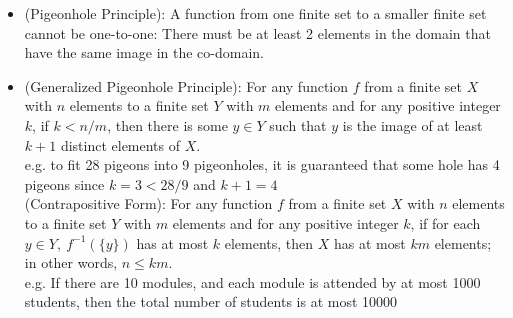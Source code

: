 \documentclass{article}
\begin{document}
\begin{itemize}
        \\ \hspace*{3mm} (2) $|A\cup B\cup C|=|A|+|B|+|C|-|A\cap B|-|A\cap C|-|B\cap C|+|A\cap B\cap C|$
    \item (Pigeonhole Principle): A function from one finite set to a smaller finite set cannot be one-to-one: There must be at least 2 elements in the domain that have the same image in the co-domain.
    \item (Generalized Pigeonhole Principle): For any function $f$ from a finite set $X$ with $n$ elements to a finite set $Y$ with $m$ elements and for any positive integer $k$, if $k<n/m$, then there is some $y\in Y$ such that $y$ is the image of at least $k+1$ distinct elements of $X$.
        \smallskip
        \\ \hspace*{3mm} e.g. to fit 28 pigeons into 9 pigeonholes, it is guaranteed that some hole has 4 pigeons since $k=3<28/9$ and \hspace*{10mm} $k+1=4$
        \smallskip
        \\(Contrapositive Form): For any function $f$ from a finite set $X$ with $n$ elements to a finite set $Y$ with $m$ elements and for any positive integer $k$, if for each $y\in Y,\  f^{-1}(\{y\})$ has at most $k$ elements, then $X$ has at most $km$ elements; in other words, $n\leqslant km$.
        \smallskip
        \\ \hspace*{3mm} e.g. If there are 10 modules, and each module is attended by at most 1000 students, then the total number \hspace*{10mm} of students is at most 10000
\end{itemize}

\end{document}
